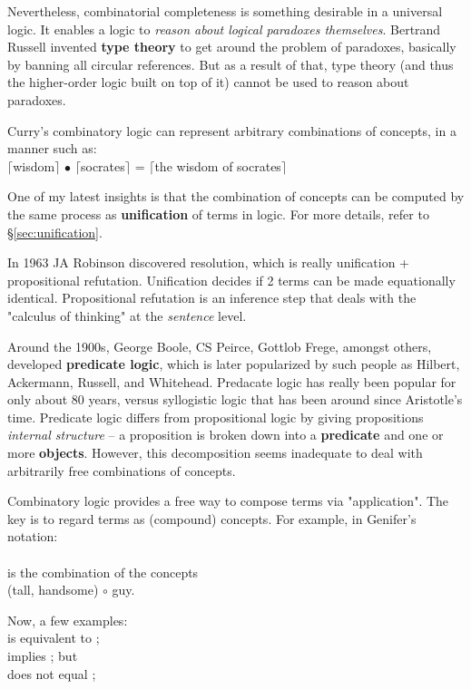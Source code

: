 Nevertheless, combinatorial completeness is something desirable in a universal logic.  It enables a logic to \textit{reason about logical paradoxes themselves}.  Bertrand Russell invented \textbf{type theory} to get around the problem of paradoxes, basically by banning all circular references.  But as a result of that, type theory (and thus the higher-order logic built on top of it) cannot be used to reason about paradoxes.

Curry's combinatory logic can represent arbitrary combinations of concepts, in a manner such as:\\
\tab $\lceil$wisdom$\rceil$ $\bullet$ $\lceil$socrates$\rceil$ = $\lceil$the wisdom of socrates$\rceil$

One of my latest insights is that the combination of concepts can be computed by the same process as \textbf{unification} of terms in logic.  For more details, refer to \S\ref{sec:unification}.

In 1963 JA Robinson discovered resolution, which is really unification + propositional refutation.  Unification decides if 2 terms can be made equationally identical.  Propositional refutation is an inference step that deals with the "calculus of thinking" at the \textit{sentence} level.

Around the 1900s, George Boole, CS Peirce, Gottlob Frege, amongst others, developed \textbf{predicate logic}, which is later popularized by such people as Hilbert, Ackermann, Russell, and Whitehead.  Predacate logic has really been popular for only about 80 years, versus syllogistic logic that has been around since Aristotle's time.  Predicate logic differs from propositional logic by giving propositions \textit{internal structure} -- a proposition is broken down into a \textbf{predicate} and one or more \textbf{objects}.  However, this decomposition seems inadequate to deal with arbitrarily free combinations of concepts.

Combinatory logic provides a free way to compose terms via "application".  The key is to regard terms as (compound) concepts.  For example, in Genifer's notation:\\
\tab {}\\
is the combination of the concepts\\
\tab (tall, handsome) $\circ$ guy.

Now, a few examples:\\
 is equivalent to ;\\
 implies ;  but\\
 does not equal ;

